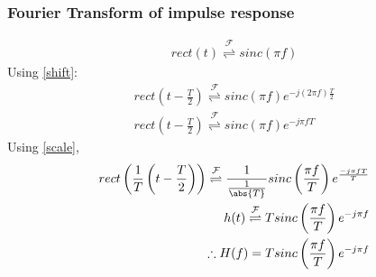 \documentclass{beamer}
\providecommand{\brak}[1]{\ensuremath{\left(#1\right)}}
\providecommand{\fourier}{\overset{\mathcal{F}}{ \rightleftharpoons}}
\begin{document}
\begin{frame}
    \frametitle{Fourier Transform of impulse response}
    \begin{flushleft}
    \begin{align}
    rect(t) \fourier sinc(\pi f)
\end{align}
Using \eqref{shift}:
\begin{align}
    rect\brak{t - \frac{T}{2}} \fourier sinc(\pi f)e^{-j(2 \pi f)\frac{T}{2}}\\
    rect\brak{t - \frac{T}{2}} \fourier sinc(\pi f)e^{-j \pi f T}
\end{align}
Using \eqref{scale},
\begin{align}
    rect\brak{\frac{1}{T}\brak{t - \frac{T}{2}}} \fourier \frac{1}{\frac{1}{\abs{T}}}sinc\brak{\frac{\pi f }{T}}e^{\frac{-j \pi f T}{T}}\\
    h(t) \fourier Tsinc\brak{\frac{\pi f }{T}}e^{-j\pi f}\\
    \therefore H(f)  = Tsinc\brak{\frac{\pi f }{T}}e^{-j\pi f}
\end{align}
    \end{flushleft}
\end{frame}
\end{document}
